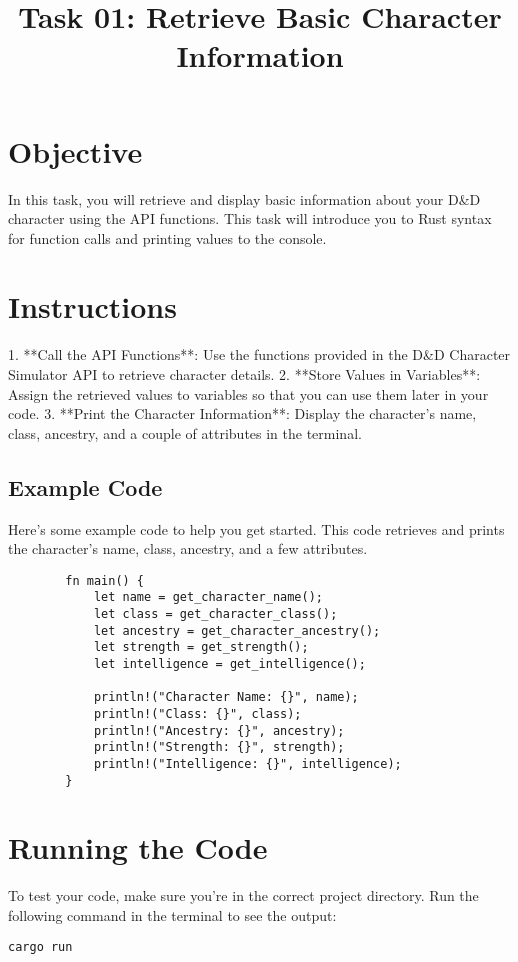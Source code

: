 \documentclass{article}
\title{Task 01: Retrieve Basic Character Information}
\author{}
\date{}
\begin{document}
	
	\maketitle
	
	\section*{Objective}
	In this task, you will retrieve and display basic information about your D\&D character using the API functions. This task will introduce you to Rust syntax for function calls and printing values to the console.
	
	\section*{Instructions}
	
	1. **Call the API Functions**: Use the functions provided in the D\&D Character Simulator API to retrieve character details.
	2. **Store Values in Variables**: Assign the retrieved values to variables so that you can use them later in your code.
	3. **Print the Character Information**: Display the character’s name, class, ancestry, and a couple of attributes in the terminal.
	
	\subsection*{Example Code}
	Here’s some example code to help you get started. This code retrieves and prints the character’s name, class, ancestry, and a few attributes.
	
	\begin{lstlisting}
		fn main() {
			let name = get_character_name();
			let class = get_character_class();
			let ancestry = get_character_ancestry();
			let strength = get_strength();
			let intelligence = get_intelligence();
			
			println!("Character Name: {}", name);
			println!("Class: {}", class);
			println!("Ancestry: {}", ancestry);
			println!("Strength: {}", strength);
			println!("Intelligence: {}", intelligence);
		}
	\end{lstlisting}
	
	\section*{Running the Code}
	To test your code, make sure you’re in the correct project directory. Run the following command in the terminal to see the output:
	\begin{lstlisting}[language=bash]
		cargo run
	\end{lstlisting}
	
\end{document}
